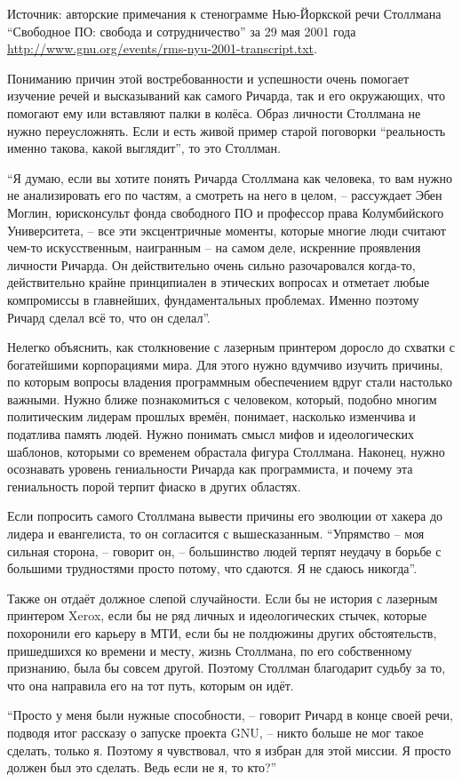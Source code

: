 Источник: авторские примечания к стенограмме Нью-Йоркской речи Столлмана \enquote{Свободное ПО: свобода и сотрудничество} за 29 мая 2001 года \url{http://www.gnu.org/events/rms-nyu-2001-transcript.txt}.

Пониманию причин этой востребованности и успешности очень помогает изучение речей и высказываний как самого Ричарда, так и его окружающих, что помогают ему или вставляют палки в колёса. Образ личности Столлмана не нужно переусложнять. Если и есть живой пример старой поговорки \enquote{реальность именно такова, какой выглядит}, то это Столлман.

\enquote{Я думаю, если вы хотите понять Ричарда Столлмана как человека, то вам нужно не анализировать его по частям, а смотреть на него в целом, -- рассуждает Эбен Моглин, юрисконсульт фонда свободного ПО и профессор права Колумбийского Университета, -- все эти эксцентричные моменты, которые многие люди считают чем-то искусственным, наигранным -- на самом деле, искренние проявления личности Ричарда. Он действительно очень сильно разочаровался когда-то, действительно крайне принципиален в этических вопросах и отметает любые компромиссы в главнейших, фундаментальных проблемах. Именно поэтому Ричард сделал всё то, что он сделал}.

Нелегко объяснить, как столкновение с лазерным принтером доросло до схватки с богатейшими корпорациями мира. Для этого нужно вдумчиво изучить причины, по которым вопросы владения программным обеспечением вдруг стали настолько важными. Нужно ближе познакомиться с человеком, который, подобно многим политическим лидерам прошлых времён, понимает, насколько изменчива и податлива память людей. Нужно понимать смысл мифов и идеологических шаблонов, которыми со временем обрастала фигура Столлмана. Наконец, нужно осознавать уровень гениальности Ричарда как программиста, и почему эта гениальность порой терпит фиаско в других областях.

Если попросить самого Столлмана вывести причины его эволюции от хакера до лидера и евангелиста, то он согласится с вышесказанным. \enquote{Упрямство -- моя сильная сторона, -- говорит он, -- большинство людей терпят неудачу в борьбе с большими трудностями просто потому, что сдаются. Я не сдаюсь никогда}.

Также он отдаёт должное слепой случайности. Если бы не история с лазерным принтером Xerox, если бы не ряд личных и идеологических стычек, которые похоронили его карьеру в МТИ, если бы не полдюжины других обстоятельств, пришедшихся ко времени и месту, жизнь Столлмана, по его собственному признанию, была бы совсем другой. Поэтому Столлман благодарит судьбу за то, что она направила его на тот путь, которым он идёт.

\enquote{Просто у меня были нужные способности, -- говорит Ричард в конце своей речи, подводя итог рассказу о запуске проекта GNU, -- никто больше не мог такое сделать, только я. Поэтому я чувствовал, что я избран для этой миссии. Я просто должен был это сделать. Ведь если не я, то кто?\hspace{0.01in}}

\theendnotes
\setcounter{endnote}{0}
